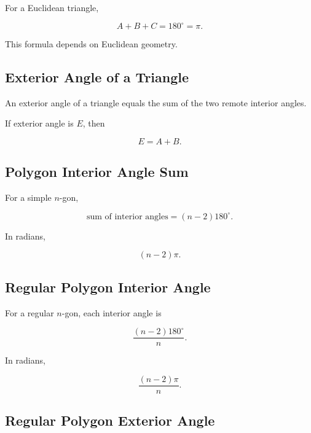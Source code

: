 For a Euclidean triangle,

\[
\boxed{
A+B+C
=
180^\circ
=
\pi.
}
\]

This formula depends on Euclidean geometry.

\subsection{Exterior Angle of a Triangle}
\label{subsec:triangle-exterior-angle}

An exterior angle of a triangle equals the sum of the two remote interior
angles.

If exterior angle is \(E\), then

\[
\boxed{
E=A+B.
}
\]

\subsection{Polygon Interior Angle Sum}
\label{subsec:polygon-interior-angle-sum}

For a simple \(n\)-gon,

\[
\boxed{
\text{sum of interior angles}
=
(n-2)180^\circ.
}
\]

In radians,

\[
\boxed{
(n-2)\pi.
}
\]

\subsection{Regular Polygon Interior Angle}
\label{subsec:regular-polygon-interior-angle}

For a regular \(n\)-gon, each interior angle is

\[
\boxed{
\frac{(n-2)180^\circ}{n}.
}
\]

In radians,

\[
\boxed{
\frac{(n-2)\pi}{n}.
}
\]

\subsection{Regular Polygon Exterior Angle}
\label{subsec:regular-polygon-exterior-angle}

